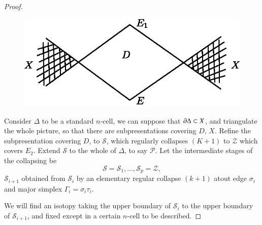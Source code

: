 \begin{proof}
~\phantom{a}

\begin{figure}[H]
\centering
\includegraphics{figure/fig21.eps}
\end{figure}

Consider $\Delta$ to be a standard $n$-cell, we can suppose that $\partial \Delta \subset X$, and triangulate the whole picture, so that there are subpresentations covering $D$, $X$. Refine the subpresentation covering $D$, to $\mathscr{S}$, which regularly collapses $(K+1)$ to $\mathscr{Z}$ which covers $E_{2}$. Extend $\mathscr{S}$ to the whole of $\Delta$, to say $\mathscr{P}$. Let the intermediate stages of the collapsing be
$$
\mathscr{S}=\mathscr{S}_{1},\ldots,\mathscr{S}_{p}=\mathscr{Z},
$$
$\mathscr{S}_{i+1}$ obtained from $\mathscr{S}_{i}$ by an elementary regular collapse $(k+1)$ at\pageoriginale out edge $\sigma_{i}$ and major simplex $\Gamma_{i}=\sigma_{i}\tau_{i}$.

We will find an isotopy taking the upper boundary of $\mathscr{S}_{i}$ to the upper boundary of $\mathscr{S}_{i+1}$, and fixed except in a certain $n$-cell to be described.


\end{proof}
